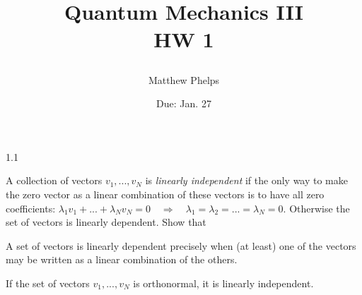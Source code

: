 \documentclass[10pt,letterpaper]{article}
\title{\begin{spacing}{1.2}Quantum Mechanics III\\HW 1\end{spacing}}
\author{Matthew Phelps}
\date{Due: Jan. 27 }
\begin{document}
\maketitle

\benum
  	 \item[1.1]
	 
	A collection of vectors $v_1,..., v_N$ is \emph{linearly independent} if the only way to make the zero
	vector as a linear combination of these vectors is to have all zero coefficients: $\lambda_1 v_1+...+
	\lambda_N v_N = 0\quad \Rightarrow \quad \lambda_1 = \lambda_2 = ... = \lambda_N = 0$. Otherwise
	the set of vectors is linearly dependent. Show that
	\benum
	\item
	A set of vectors is linearly dependent precisely when (at least) one of the vectors may be written as a linear
	combination of the others.
	\item
	If the set of vectors $v_1,...,v_N$ is orthonormal, it is linearly independent.
	\\ \\
	\eenum
	
\end{document}
